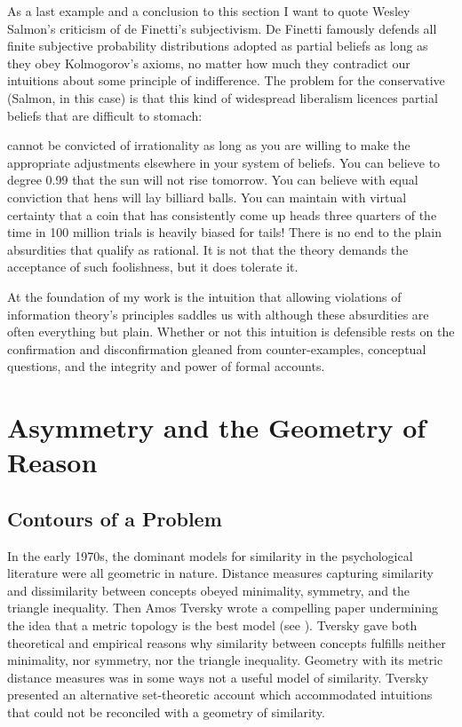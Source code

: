 \documentclass[phd,12pt,oneside]{ubcthesis}
\begin{document}
As a last example and a conclusion to this section I want to quote
Wesley Salmon's criticism of de Finetti's subjectivism. De Finetti
famously defends all finite subjective probability distributions
adopted as partial beliefs as long as they obey Kolmogorov's axioms,
no matter how much they contradict our intuitions about some principle
of indifference. The problem for the conservative (Salmon, in this
case) is that this kind of widespread liberalism licences partial
beliefs that are difficult to stomach:

\begin{quotex}
   cannot be convicted of
  irrationality as long as you are willing to make the appropriate
  adjustments elsewhere in your system of beliefs. You can believe to
  degree 0.99 that the sun will not rise tomorrow. You can believe
  with equal conviction that hens will lay billiard balls. You can
  maintain with virtual certainty that a coin that has consistently
  come up heads three quarters of the time in 100 million trials is
  heavily biased for tails! There is no end to the plain absurdities
  that qualify as rational. It is not that the theory demands the
  acceptance of such foolishness, but it does tolerate it.\tbd{}
\end{quotex}

At the foundation of my work is the intuition that allowing violations
of information theory's principles saddles us with  although these absurdities are often
everything but plain. Whether or not this intuition is defensible
rests on the confirmation and disconfirmation gleaned from
counter-examples, conceptual questions, and the integrity and power of
formal accounts.

\chapter{Asymmetry and the Geometry of Reason}
\label{chp:gahrihoo}

\section{Contours of a Problem}
\label{sec:teiyaefi}

In the early 1970s, the dominant models for similarity in the
psychological literature were all geometric in nature. Distance
measures capturing similarity and dissimilarity between concepts
obeyed minimality, symmetry, and the triangle inequality. Then Amos
Tversky wrote a compelling paper undermining the idea that a metric
topology is the best model (see ). Tversky gave
both theoretical and empirical reasons why similarity between concepts
fulfills neither minimality, nor symmetry, nor the triangle inequality.
Geometry with its metric distance measures was in some ways not a
useful model of similarity. Tversky presented an alternative
set-theoretic account which accommodated intuitions that could not be
reconciled with a geometry of similarity.
\end{document}
